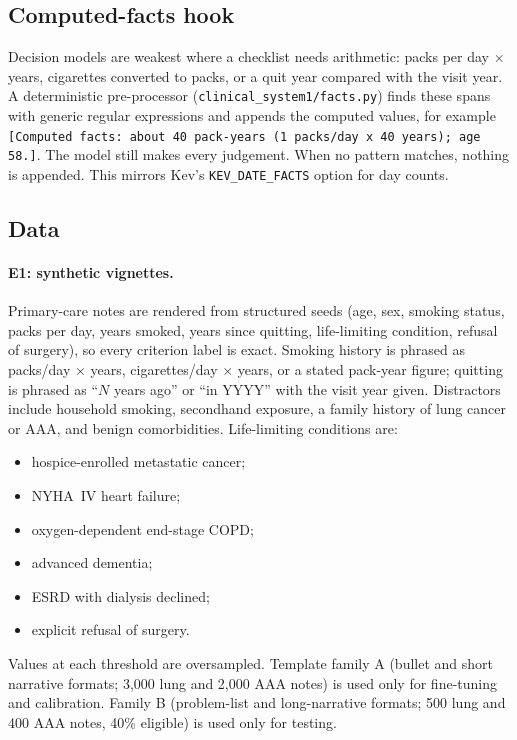 \documentclass[11pt]{article}
\begin{document}
\subsection{Computed-facts hook}
\label{sec:facts}
Decision models are weakest where a checklist needs arithmetic: packs per day $\times$ years, cigarettes converted to packs, or a quit year compared with the visit year.
A deterministic pre-processor (\texttt{clinical\_system1/facts.py}) finds these spans with generic regular expressions and appends the computed values, for example \texttt{[Computed facts: about 40 pack-years (1 packs/day x 40 years); age 58.]}.
The model still makes every judgement. When no pattern matches, nothing is appended.
This mirrors Kev's \texttt{KEV\_DATE\_FACTS} option for day counts.

\subsection{Data}
\label{sec:data}
\paragraph{E1: synthetic vignettes.}
Primary-care notes are rendered from structured seeds (age, sex, smoking status, packs per day, years smoked, years since quitting, life-limiting condition, refusal of surgery), so every criterion label is exact.
Smoking history is phrased as packs/day $\times$ years, cigarettes/day $\times$ years, or a stated pack-year figure; quitting is phrased as ``$N$ years ago'' or ``in YYYY'' with the visit year given.
Distractors include household smoking, secondhand exposure, a family history of lung cancer or AAA, and benign comorbidities.
Life-limiting conditions are:
\begin{itemize}[nosep]
\item hospice-enrolled metastatic cancer;
\item NYHA~IV heart failure;
\item oxygen-dependent end-stage COPD;
\item advanced dementia;
\item ESRD with dialysis declined;
\item explicit refusal of surgery.
\end{itemize}
Values at each threshold are oversampled.
Template family A (bullet and short narrative formats; 3{,}000 lung and 2{,}000 AAA notes) is used only for fine-tuning and calibration.
Family B (problem-list and long-narrative formats; 500 lung and 400 AAA notes, 40\% eligible) is used only for testing.
\end{document}
